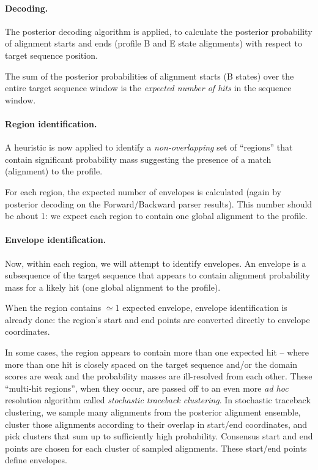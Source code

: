 \paragraph{Decoding.}
The posterior decoding algorithm is applied, to calculate the
posterior probability of alignment starts and ends (profile B and E
state alignments) with respect to target sequence position.

The sum of the posterior probabilities of alignment starts (B states)
over the entire target sequence window is the \emph{expected number of
hits} in the sequence window.

\paragraph{Region identification.}

A heuristic is now applied to identify a \emph{non-overlapping} set of
``regions'' that contain significant probability mass suggesting the
presence of a match (alignment) to the profile.

For each region, the expected number of envelopes is calculated (again
by posterior decoding on the Forward/Backward parser results). This
number should be about 1: we expect each region to contain one global
alignment to the profile. 

\paragraph{Envelope identification.}

Now, within each region, we will attempt to identify envelopes.
An envelope is a subsequence of the target sequence that
appears to contain alignment probability mass for a likely hit (one
global alignment to the profile).

When the region contains $\simeq$1 expected envelope, envelope
identification is already done: the region's start and end points are
converted directly to envelope coordinates.

In some cases, the region appears to contain more than
one expected hit -- where more than one hit is closely spaced on
the target sequence and/or the domain scores are weak and the
probability masses are ill-resolved from each other. These
``multi-hit regions'', when they occur, are passed off to an even
more \emph{ad hoc} resolution algorithm called \emph{stochastic
  traceback clustering}. In stochastic traceback clustering, we sample
many alignments from the posterior alignment ensemble, cluster those
alignments according to their overlap in start/end coordinates, and
pick clusters that sum up to sufficiently high probability. Consensus
start and end points are chosen for each cluster of sampled
alignments. These start/end points define envelopes.


